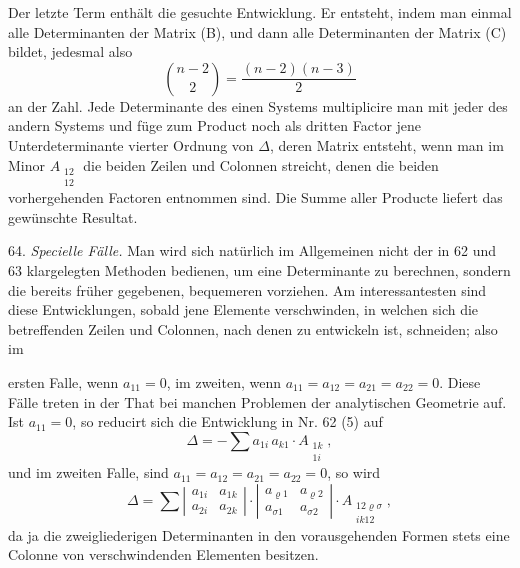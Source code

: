 Der letzte Term enthält die gesuchte Entwicklung. Er entsteht, indem man einmal alle Determinanten der Matrix (B), und dann alle Determinanten der Matrix (C) bildet, jedesmal also
\[
\binom{n-2}{2} = \frac{(n-2)(n-3)}{2}
\]
an der Zahl. Jede Determinante des einen Systems multiplicire man mit jeder des andern Systems und füge zum Product noch als dritten Factor jene Unterdeterminante vierter Ordnung von $\Delta$, deren Matrix entsteht, wenn man im Minor $A_{\substack{12\\12}}$ die beiden Zeilen und Colonnen streicht, denen die beiden vorhergehenden Factoren entnommen sind. Die Summe aller Producte liefert das gewünschte Resultat.

64. \textit{Specielle F\"alle.} Man wird sich natürlich im Allgemeinen nicht der in 62 und 63 klargelegten Methoden bedienen, um eine Determinante zu berechnen, sondern die bereits früher gegebenen, bequemeren vorziehen. Am interessantesten sind diese Entwicklungen, sobald jene Elemente verschwinden, in welchen sich die betreffenden Zeilen und Colonnen, nach denen zu entwickeln ist, schneiden; also im


ersten Falle, wenn $a_{11}=0$, im zweiten, wenn $a_{11}=a_{12}=a_{21}=a_{22}=0$. Diese Fälle treten in der That bei manchen Problemen der analytischen Geometrie auf. Ist $a_{11}=0$, so reducirt sich die Entwicklung in Nr. 62 (5) auf
\[
\Delta = -\sum a_{1i}\,a_{k1}\cdot A_{\substack{1k\\1i}},
\]
und im zweiten Falle, sind $a_{11}=a_{12}=a_{21}=a_{22}=0$, so wird
\[
\Delta = \sum \left|\begin{array}{cc} a_{1i} & a_{1k}\\ a_{2i} & a_{2k}\end{array}\right|\cdot \left|\begin{array}{cc} a_{\varrho1} & a_{\varrho2}\\ a_{\sigma1} & a_{\sigma2}\end{array}\right|\cdot A_{\substack{12\varrho\sigma\\ik12}},
\]
da ja die zweigliederigen Determinanten in den vorausgehenden Formen stets eine Colonne von verschwindenden Elementen besitzen.

